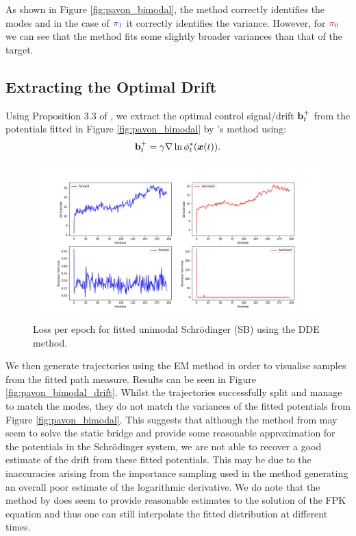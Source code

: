 \documentclass[a4paper,12pt,twoside,openright]{report}
\theoremstyle{definition}
\begin{document}
As shown in Figure \ref{fig:pavon_bimodal}, the method correctly identifies the modes and in the case of $\color{blue}{\pi_1}$ it correctly identifies the variance. However, for $\color{red}{\pi_0}$ we can see that the method fits some slightly broader variances than that of the target. 
\subsection{Extracting the Optimal Drift}

Using Proposition 3.3 of \cite{pavon1991free}, we extract the optimal control signal/drift ${\mathbf{b}}_t^+$ from the potentials fitted in Figure \ref{fig:pavon_bimodal} by \cite{pavon2018data}'s method using: 
\begin{align*} 
    {\mathbf{b}}_t^{+} = \gamma \nabla \ln \phi^*_t({\bm{x}}(t)).
\end{align*}
\begin{figure}
    \centering
    \includegraphics[scale=0.4,trim={2.3cm 1cm 2.5cm 0}, clip]{images/GP/SB_gp_bigvar_epochs_samp_200.png}
    \caption{Loss per epoch for fitted unimodal Schrödinger (SB) using the DDE method.}
    \label{fig:epochsbigvargp}
\end{figure}
We then generate trajectories using the EM method in order to visualise samples from the fitted path measure. Results can be seen in Figure \ref{fig:pavon_bimodal_drift}. Whilst the trajectories successfully split and manage to match the modes, they do not match the variances of the fitted potentials from Figure \ref{fig:pavon_bimodal}. This suggests that although the method from \cite{pavon2018data} may seem to solve the static bridge and provide some reasonable approximation for the potentials in the Schrödinger system, we are not able to recover a good estimate of the drift from these fitted potentials. This may be due to the inaccuracies arising from the importance sampling used in the method generating an overall poor estimate of the logarithmic derivative. We do note that the method by \cite{pavon2018data} does seem to provide reasonable estimates to the solution of the FPK equation and thus one can still interpolate the fitted distribution at different times.
\end{document}
